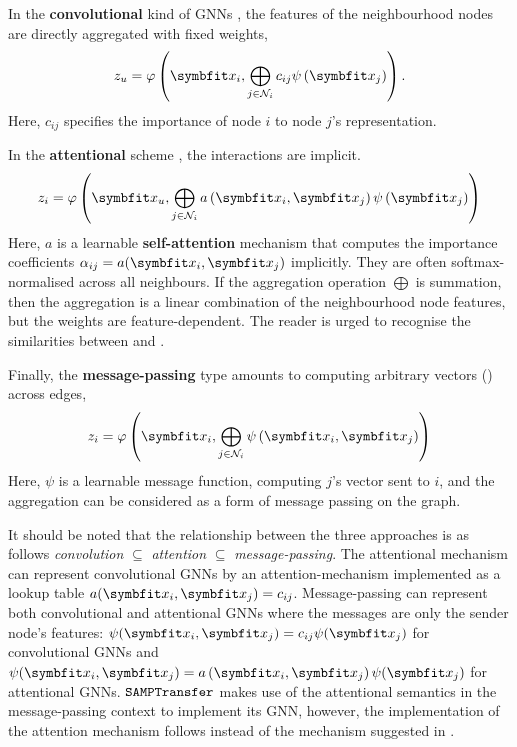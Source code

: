 In the \textbf{convolutional} kind of GNNs \parencite{kipf2016semi}, the features of the neighbourhood nodes are directly aggregated with fixed weights,
\begin{equation}
    z_{u}=\varphi\left(\bfitx_{i}, \bigoplus_{j \in \mathcal{N}_{i}} c_{i j} \psi\left(\bfitx_{j}\right)\right).
    \label{eqn:gcn}
\end{equation}
Here, $c_{ij}$ specifies the importance of node $i$ to node $j$'s representation.

In the \textbf{attentional} scheme \parencite{velic018graph, brody2021attentive}, the interactions are implicit.
\begin{equation}
z_{i}=\varphi\left(\bfitx_{u}, \bigoplus_{j \in \mathcal{N}_{i}} a\left(\bfitx_{i}, \bfitx_{j}\right) \psi\left(\bfitx_{j}\right)\right)
\label{eqn:attn-gnn}
\end{equation}
Here, $a$ is a learnable \textbf{self-attention} mechanism that computes the importance coefficients $\alpha_{ij} = a(\bfitx_i,\bfitx_j)$ implicitly. They are often softmax-normalised across all neighbours. If the aggregation operation $\bigoplus$ is summation, then the aggregation is a linear combination of the neighbourhood node features, but the weights are feature-dependent. The reader is urged to recognise the similarities between  and .

Finally, the \textbf{message-passing} type amounts to computing arbitrary vectors () across edges,
\begin{equation}
    z_{i}=\varphi\left(\bfitx_{i}, \bigoplus_{j \in \mathcal{N}_{i}} \psi\left(\bfitx_{i}, \bfitx_{j}\right)\right)
    \label{eqn:mesg-passing}
\end{equation}
Here, $\psi$ is a learnable message function, computing $j$'s vector sent to $i$, and the aggregation can be considered as a form of message passing on the graph.

It should be noted that the relationship between the three approaches is as follows \textit{convolution} $\subseteq$ \textit{attention} $\subseteq$ \textit{message-passing}. The attentional mechanism can represent convolutional GNNs by an attention-mechanism implemented as a lookup table $a(\bfitx_i, \bfitx_j) = c_{ij}$. Message-passing can represent both convolutional and attentional GNNs where the messages are only the sender node's features: $\psi(\bfitx_i, \bfitx_j)=c_{ij}\psi(\bfitx_j)$ for convolutional GNNs and $\psi(\bfitx_i, \bfitx_j)=a\left(\bfitx_{i}, \bfitx_{j}\right)\psi(\bfitx_j)$ for attentional GNNs. $\texttt{SAMPTransfer}$ makes use of the attentional semantics in the message-passing context to implement its GNN, however, the implementation of the attention mechanism follows \parencite{vaswani2017attention} instead of the mechanism suggested in \parencite{velic018graph}.


